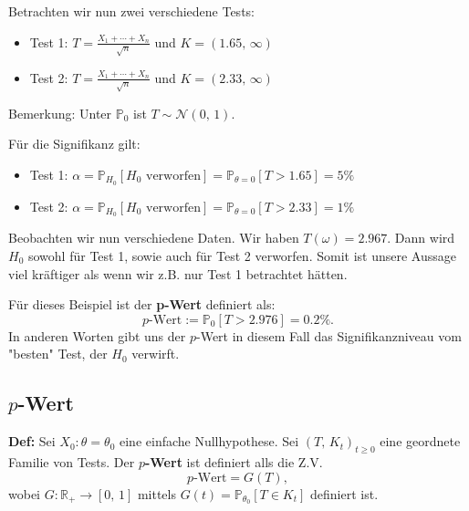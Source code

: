 \documentclass[a4paper]{extarticle}
\begin{document}
Betrachten wir nun zwei verschiedene Tests:
\begin{itemize}
    \item Test 1: $T = \frac{X_1 + \cdots + X_n}{\sqrt{n}}$ und $K = (1.65, \, \infty)$
    \item Test 2: $T = \frac{X_1 + \cdots + X_n}{\sqrt{n}}$ und $K = (2.33, \, \infty)$
\end{itemize}

Bemerkung: Unter $\mathbb{P}_0$ ist $T \sim \mathcal{N}(0, \, 1)$.

Für die Signifikanz gilt:
\begin{itemize}
    \item Test 1: $\alpha = \mathbb{P}_{H_0}[H_0 \text{ verworfen}] = \mathbb{P}_{\theta = 0}[T > 1.65] = 5 \%$
    \item Test 2: $\alpha = \mathbb{P}_{H_0}[H_0 \text{ verworfen}] = \mathbb{P}_{\theta = 0}[T > 2.33] = 1 \%$
\end{itemize}

Beobachten wir nun verschiedene Daten. Wir haben $T(\omega) = 2.967$. Dann wird $H_0$ sowohl für Test 1, sowie auch für Test 2 verworfen. Somit ist unsere Aussage viel kräftiger als wenn wir z.B. nur Test 1 betrachtet hätten.

Für dieses Beispiel ist der \textbf{p-Wert} definiert als:
\[
    p\text{-Wert} := \mathbb{P}_0[T > 2.976] = 0.2\%.
\]
In anderen Worten gibt uns der $p$-Wert in diesem Fall das Signifikanzniveau vom "besten" Test, der $H_0$ verwirft.

\subsection{$p$-Wert}

\textbf{Def:} Sei $X_0 : \theta = \theta_0$ eine einfache Nullhypothese. Sei $(T, \, K_t)_{t \geq 0}$ eine geordnete Familie von Tests. Der $p$\textbf{-Wert} ist definiert alls die Z.V.
\[
    p\text{-Wert} = G(T),
\]
wobei $G : \mathbb{R}_+ \to [0, \, 1]$ mittels $G(t) = \mathbb{P}_{\theta_0}[T \in K_t]$ definiert ist.
\end{document}
